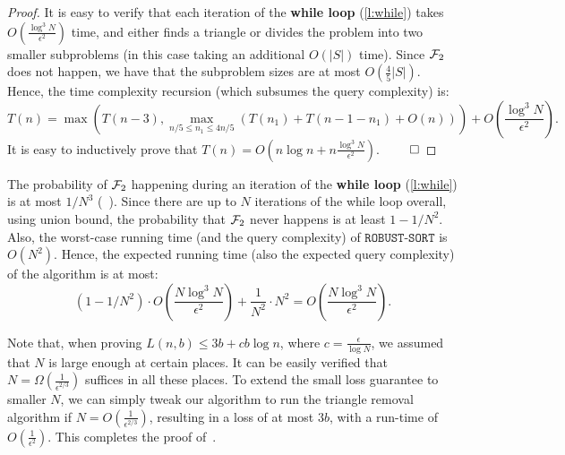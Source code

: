 \documentclass[11pt]{llncs}
\newcommand{\RS}{{\texttt{ROBUST-SORT}}}
\begin{document}
\begin{proof}
    It is easy to verify that each iteration of the {\bf while loop} (\ref{l:while}) takes $O(\frac{\log^3 N}{\epsilon^2})$ time, and either finds a triangle or divides the problem into two smaller subproblems (in this case taking an additional $O(|S|)$ time). Since ${\cal F}_2$ does not happen, we have that the subproblem sizes are at most $O(\frac{4}{5} |S|)$.  Hence, the time complexity recursion (which subsumes the query complexity) is:
    $$T(n) = \max\left (T(n-3), \max_{n/5 \leq n_1 \leq 4n/5} (T(n_1) + T(n - 1 - n_1) + O(n)) \right) + O\left(\frac{\log^3 N}{\epsilon^2}\right).$$
    It is easy to inductively prove that $T(n) = O\left(n \log n + n \frac{\log^3 N}{\epsilon^2}\right).$
    $\qed$
\end{proof}

The probability of ${\cal F}_2$ happening during an iteration of the {\bf while loop} (\ref{l:while}) is at most $1/N^3$ (~). Since there are up to $N$ iterations of the while loop overall, using union bound, the probability that ${\cal F}_2$ never happens is at least $1 - 1/N^2$. Also, the worst-case running time (and the query complexity) of $\RS$ is $O(N^2)$. Hence, the expected running time (also the expected query complexity) of the algorithm is at most:
$$\left(1-1/N^2\right) \cdot O\left(\frac{N \log^3 N}{\epsilon^2}\right) + \frac{1}{N^2} \cdot N^2 = O\left(\frac{N \log^3 N}{\epsilon^2}\right).$$

Note that, when proving $L(n, b) \le 3b + cb \log n$, where $c = \frac{\epsilon}{\log N}$, we assumed that $N$ is large enough at certain places. It can be easily verified that $N = \Omega (\frac{1}{\epsilon^{2/3}})$ suffices in all these places. To extend the small loss guarantee to smaller $N$, we can simply tweak our algorithm to run the triangle removal algorithm if $N = O(\frac{1}{\epsilon^{2/3}})$, resulting in a loss of at most $3 b$, with a run-time of $O(\frac{1}{\epsilon^2})$.
This completes the proof of~. 
\end{document}
